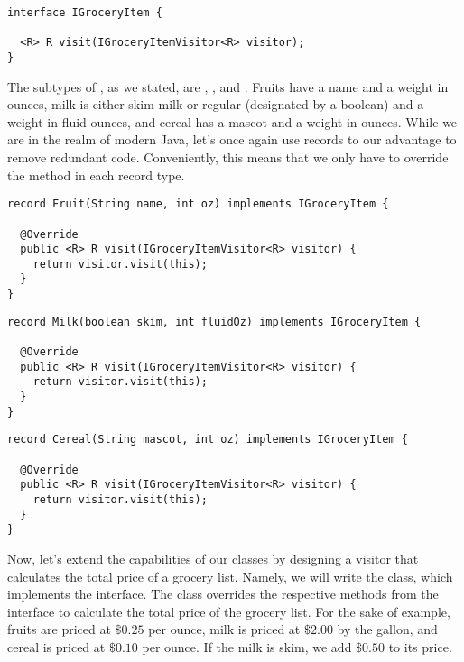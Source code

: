 \begin{cl}[]{}
\begin{lstlisting}[language=MyJava]
interface IGroceryItem {

  <R> R visit(IGroceryItemVisitor<R> visitor);
}
\end{lstlisting}
\end{cl}

The subtypes of , as we stated, are , , and . Fruits have a name and a weight in ounces, milk is either skim milk or regular (designated by a boolean) and a weight in fluid ounces, and cereal has a mascot and a weight in ounces. While we are in the realm of modern Java, let's once again use records to our advantage to remove redundant code. Conveniently, this means that we only have to override the  method in each record type.

\begin{cl}[]{}
\begin{lstlisting}[language=MyJava]
record Fruit(String name, int oz) implements IGroceryItem {

  @Override
  public <R> R visit(IGroceryItemVisitor<R> visitor) { 
    return visitor.visit(this); 
  }
}
\end{lstlisting}
\end{cl}

\begin{cl}[]{}
\begin{lstlisting}[language=MyJava]
record Milk(boolean skim, int fluidOz) implements IGroceryItem {
  
  @Override
  public <R> R visit(IGroceryItemVisitor<R> visitor) {
    return visitor.visit(this); 
  }
}
\end{lstlisting}
\end{cl}

\begin{cl}[]{}
\begin{lstlisting}[language=MyJava]
record Cereal(String mascot, int oz) implements IGroceryItem {
    
  @Override
  public <R> R visit(IGroceryItemVisitor<R> visitor) {
    return visitor.visit(this); 
  }
}
\end{lstlisting}
\end{cl}

Now, let's extend the capabilities of our classes by designing a visitor that calculates the total price of a grocery list. Namely, we will write the  class, which implements the  interface. The  class overrides the respective methods from the  interface to calculate the total price of the grocery list. For the sake of example, fruits are priced at $\$0.25$ per ounce, milk is priced at $\$2.00$ by the gallon, and cereal is priced at $\$0.10$ per ounce. If the milk is skim, we add $\$0.50$ to its price.

